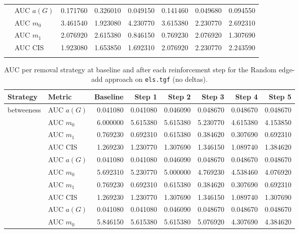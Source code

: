 \begin{table}[htbp]
\begin{tabular}{llrrrrrr}
    \addlinespace
    \multirow{4}{*}{random} & AUC $a(G)$ & 0.171760 & 0.326010 & 0.049150 & 0.141460 & 0.049680 & 0.094550 \\
    & AUC $m_0$ & 3.461540 & 1.923080 & 4.230770 & 3.615380 & 2.230770 & 2.692310 \\
    & AUC $m_1$ & 2.076920 & 2.615380 & 0.846150 & 0.769230 & 2.076920 & 1.307690 \\
    & AUC CIS & 1.923080 & 1.653850 & 1.692310 & 2.076920 & 2.230770 & 2.243590 \\
    \addlinespace
    \bottomrule
  \end{tabular}
\end{table}

\begin{table}[htbp]
  \centering
  \caption{AUC per removal strategy at baseline and after each reinforcement step for the Random edge-add approach on \texttt{els.tgf} (no deltas).}
  \label{tab:els-random_add-auc}
  \begin{tabular}{llrrrrrr}
    \toprule
    \textbf{Strategy} & \textbf{Metric} & \textbf{Baseline} & \textbf{Step 1} & \textbf{Step 2} & \textbf{Step 3} & \textbf{Step 4} & \textbf{Step 5} \\
    \midrule
    \multirow{4}{*}{betweeness} & AUC $a(G)$ & 0.041080 & 0.041080 & 0.046090 & 0.048670 & 0.048670 & 0.048670 \\
    & AUC $m_0$ & 6.000000 & 5.615380 & 5.615380 & 5.230770 & 4.615380 & 4.153850 \\
    & AUC $m_1$ & 0.769230 & 0.692310 & 0.615380 & 0.384620 & 0.307690 & 0.692310 \\
    & AUC CIS & 1.269230 & 1.230770 & 1.307690 & 1.346150 & 1.089740 & 1.384620 \\
    \addlinespace
    \multirow{4}{*}{closeness} & AUC $a(G)$ & 0.041080 & 0.041080 & 0.046090 & 0.048670 & 0.048670 & 0.048670 \\
    & AUC $m_0$ & 5.692310 & 5.230770 & 5.000000 & 4.769230 & 4.538460 & 4.076920 \\
    & AUC $m_1$ & 0.769230 & 0.692310 & 0.615380 & 0.384620 & 0.307690 & 0.692310 \\
    & AUC CIS & 1.269230 & 1.230770 & 1.307690 & 1.346150 & 1.089740 & 1.307690 \\
    \addlinespace
    \multirow{4}{*}{core influence} & AUC $a(G)$ & 0.041080 & 0.041080 & 0.046090 & 0.048670 & 0.048670 & 0.048670 \\
    & AUC $m_0$ & 5.846150 & 5.615380 & 5.615380 & 5.076920 & 4.307690 & 4.384620 \\

\end{tabular}
\end{table}
